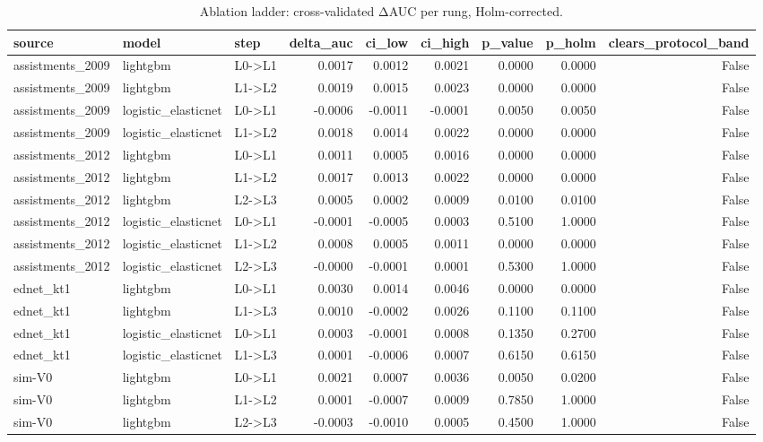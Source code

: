 \begin{table}
\caption{Ablation ladder: cross-validated ΔAUC per rung, Holm-corrected.}
\label{tab:ablation-ladder}
\begin{tabular}{lllrrrrrr}
\toprule
source & model & step & delta\_auc & ci\_low & ci\_high & p\_value & p\_holm & clears\_protocol\_band \\
\midrule
assistments\_2009 & lightgbm & L0->L1 & 0.0017 & 0.0012 & 0.0021 & 0.0000 & 0.0000 & False \\
assistments\_2009 & lightgbm & L1->L2 & 0.0019 & 0.0015 & 0.0023 & 0.0000 & 0.0000 & False \\
assistments\_2009 & logistic\_elasticnet & L0->L1 & -0.0006 & -0.0011 & -0.0001 & 0.0050 & 0.0050 & False \\
assistments\_2009 & logistic\_elasticnet & L1->L2 & 0.0018 & 0.0014 & 0.0022 & 0.0000 & 0.0000 & False \\
assistments\_2012 & lightgbm & L0->L1 & 0.0011 & 0.0005 & 0.0016 & 0.0000 & 0.0000 & False \\
assistments\_2012 & lightgbm & L1->L2 & 0.0017 & 0.0013 & 0.0022 & 0.0000 & 0.0000 & False \\
assistments\_2012 & lightgbm & L2->L3 & 0.0005 & 0.0002 & 0.0009 & 0.0100 & 0.0100 & False \\
assistments\_2012 & logistic\_elasticnet & L0->L1 & -0.0001 & -0.0005 & 0.0003 & 0.5100 & 1.0000 & False \\
assistments\_2012 & logistic\_elasticnet & L1->L2 & 0.0008 & 0.0005 & 0.0011 & 0.0000 & 0.0000 & False \\
assistments\_2012 & logistic\_elasticnet & L2->L3 & -0.0000 & -0.0001 & 0.0001 & 0.5300 & 1.0000 & False \\
ednet\_kt1 & lightgbm & L0->L1 & 0.0030 & 0.0014 & 0.0046 & 0.0000 & 0.0000 & False \\
ednet\_kt1 & lightgbm & L1->L3 & 0.0010 & -0.0002 & 0.0026 & 0.1100 & 0.1100 & False \\
ednet\_kt1 & logistic\_elasticnet & L0->L1 & 0.0003 & -0.0001 & 0.0008 & 0.1350 & 0.2700 & False \\
ednet\_kt1 & logistic\_elasticnet & L1->L3 & 0.0001 & -0.0006 & 0.0007 & 0.6150 & 0.6150 & False \\
sim-V0 & lightgbm & L0->L1 & 0.0021 & 0.0007 & 0.0036 & 0.0050 & 0.0200 & False \\
sim-V0 & lightgbm & L1->L2 & 0.0001 & -0.0007 & 0.0009 & 0.7850 & 1.0000 & False \\
sim-V0 & lightgbm & L2->L3 & -0.0003 & -0.0010 & 0.0005 & 0.4500 & 1.0000 & False \\

\end{tabular}
\end{table}
